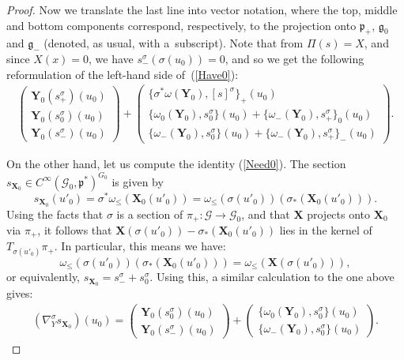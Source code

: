 \documentclass[pdftex]{sigma}
\def\g{\mathfrak{g}}
\def\p{\mathfrak{p}}
\def\Gbdle{\mathcal{G}}
\theoremstyle{plain}
\theoremstyle{definition}
\begin{document}
\begin{proof}
 Now we translate the last line into vector notation, where the top, middle and bottom components correspond, respectively, to the projection onto $\p_+$, $\g_0$ and $\g_-$ (denoted, as usual, with a~subscript). Note that from $\Pi(s) = X$, and since $X(x) = 0$, we have $s^{\sigma}_-(\sigma(u_0)) = 0$, and so we get the following reformulation of the left-hand side of~(\ref{Have0}):
\begin{gather}
\left(\begin{array}{c}
    \mathbf{Y}_0(s^{\sigma}_+)(u_0) \\
    \mathbf{Y}_0(s^{\sigma}_0)(u_0) \\
    \mathbf{Y}_0(s^{\sigma}_-)(u_0)\end{array}\right) +
\left(\begin{array}{c}
    \{\sigma^*\omega(\mathbf{Y}_0),[s]^{\sigma}\}_+(u_0) \\
    \{\omega_0(\mathbf{Y}_0),s_0^{\sigma}\}(u_0) + \{\omega_{-}(\mathbf{Y}_0),s^{\sigma}_+\}_0(u_0) \\
    \{\omega_{-}(\mathbf{Y}_0),s^{\sigma}_0\}(u_0) +
    \{\omega_{-}(\mathbf{Y}_0),s^{\sigma}_+\}_-(u_0)
     \end{array}\right). \label{Have0 wrt sigma}
\end{gather}

On the other hand, let us compute the identity (\ref{Need0}). The section $s_{\mathbf{X}_0} \in C^{\infty}(\Gbdle_0,\p^*)^{G_0}$ is given by
\[
s_{\mathbf{X}_0}(u'_0) = \sigma^* \omega_{\leq}(\mathbf{X}_0(u'_0)) = \omega_{\leq}(\sigma(u'_0))(\sigma_*(\mathbf{X}_0(u'_0))).
\]
Using the facts that $\sigma$ is a section of $\pi_+:\Gbdle \rightarrow \Gbdle_0$, and that $\mathbf{X}$ projects onto $\mathbf{X}_0$ via $\pi_+$, it follows that $\mathbf{X}(\sigma(u'_0)) - \sigma_*(\mathbf{X}_0(u'_0))$ lies in the kernel of $T_{\sigma(u'_0)} \pi_+$. In particular, this means we have:
\[
\omega_{\leq}(\sigma(u'_0))(\sigma_*(\mathbf{X}_0(u'_0))) = \omega_{\leq}(\mathbf{X}(\sigma(u'_0))),
\]
or equivalently, $s_{\mathbf{X}_0} = s^{\sigma}_- + s^{\sigma}_0$. Using this, a similar calculation to the one above gives:
\begin{gather}
(\nabla^{\sigma}_Y s_{\mathbf{X}_0})(u_0) =
    \left(\begin{array}{c}
    \mathbf{Y}_0(s^{\sigma}_0)(u_0) \\
    \mathbf{Y}_0(s^{\sigma}_-)(u_0)\end{array}\right) +
    \left(\begin{array}{c}
    \{\omega_0(\mathbf{Y}_0),s_0^{\sigma}\}(u_0) \\
    \{\omega_{-}(\mathbf{Y}_0),s^{\sigma}_0\}(u_0) \end{array}\right).
\label{Need0 wrt sigma}
\end{gather}


\end{proof}
\end{document}
